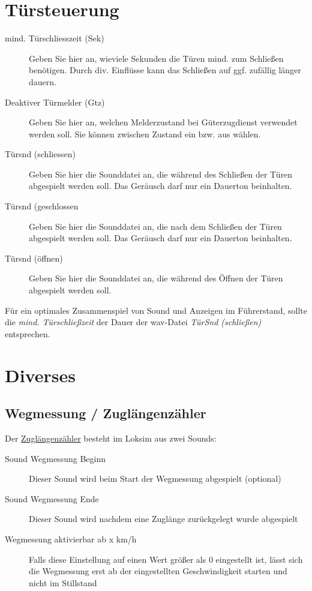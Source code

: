 \section{Türsteuerung}
\begin{description}
\item[mind. Türschliesszeit (Sek)] Geben Sie hier an, wieviele Sekunden die Türen mind. zum Schließen benötigen. Durch div. Einflüsse kann das Schließen auf ggf. zufällig länger dauern.
\item[Deaktiver Türmelder (Gtz)] Geben Sie hier an, welchen Melderzustand bei Güterzugdienst verwendet werden soll. Sie können zwischen Zustand ein bzw. aus wählen.
\item[Türsnd (schliessen)] Geben Sie hier die Sounddatei an, die während des Schließen der Türen abgespielt werden soll. Das Geräusch darf nur ein Dauerton beinhalten.
\item[Türsnd (geschlossen] Geben Sie hier die Sounddatei an, die nach dem Schließen der Türen abgespielt werden soll. Das Geräusch darf nur ein Dauerton beinhalten.
\item[Türsnd (öffnen)] Geben Sie hier die Sounddatei an, die während des Öffnen der Türen abgespielt werden soll.
\end{description}
Für ein optimales Zusammenspiel von Sound und Anzeigen im Führerstand, sollte die \emph{mind. Türschließzeit} der Dauer der wav-Datei \emph{TürSnd (schließen)} entsprechen.

\section{Diverses}
\subsection{Wegmessung / Zuglängenzähler}
Der \hyperref[sec.sim.steuerung.diverses.wegmessung]{Zuglängenzähler} besteht im Loksim aus zwei Sounds:
\begin{description}
\item[Sound Wegmessung Beginn] Dieser Sound wird beim Start der Wegmessung abgespielt (optional)
\item[Sound Wegmessung Ende] Dieser Sound wird nachdem eine Zuglänge zurückgelegt wurde abgespielt
\item[Wegmessung aktivierbar ab x km/h] Falls diese Einstellung auf einen Wert größer als 0 eingestellt ist, lässt sich die Wegmessung erst ab der eingestellten Geschwindigkeit starten und nicht im Stillstand
\end{description}